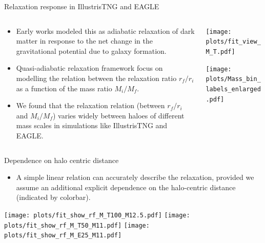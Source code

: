 \documentclass{beamer}
\begin{document}
\begin{frame}{Relaxation response in IllustrisTNG and EAGLE}
\begin{columns}
\begin{column}{0.49\linewidth}
    \begin{itemize}
        \item Early works modeled this as adiabatic relaxation of dark matter in response to the net change in the gravitational potential due to galaxy formation.
        \item Quasi-adiabatic relaxation framework focus on modelling the relation between the relaxation ratio $r_f/r_i$ as a function of the mass ratio $M_i/M_f$.
        \item We found that the relaxation relation (between $r_f/r_i$ and $M_i/M_f$) varies widely between haloes of different mass scales in simulations like IllustrisTNG and EAGLE.
    \end{itemize}
    
\end{column}
\begin{column}{0.5\linewidth}
    \begin{center}
        \texttt{[image: plots/fit\_view\_M\_T.pdf]}
    \end{center}
    \begin{center}
        \texttt{[image: plots/Mass\_bin\_labels\_enlarged.pdf]}
    \end{center}
\end{column}
\end{columns}
\end{frame}

\begin{frame}{Dependence on halo centric distance}
\begin{itemize}
    \item A simple linear relation can accurately describe the relaxation, provided we assume an additional explicit dependence on the halo-centric distance (indicated by colorbar).
\end{itemize}
\begin{center}
    \texttt{[image: plots/fit\_show\_rf\_M\_T100\_M12.5.pdf]}
    \texttt{[image: plots/fit\_show\_rf\_M\_T50\_M11.pdf]}
    \texttt{[image: plots/fit\_show\_rf\_M\_E25\_M11.pdf]}
\end{center}
\end{frame}
\end{document}

